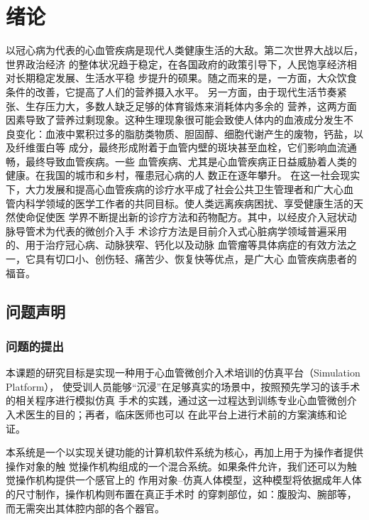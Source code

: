 \chapter{绪\;\;\;论}
\label{chap1}

以冠心病为代表的心血管疾病是现代人类健康生活的大敌。第二次世界大战以后，世界政治经济
的整体状况趋于稳定，在各国政府的政策引导下，人民饱享经济相对长期稳定发展、生活水平稳
步提升的硕果。随之而来的是，一方面，大众饮食条件的改善，它提高了人们的营养摄入水平。
另一方面，由于现代生活节奏紧张、生存压力大，多数人缺乏足够的体育锻炼来消耗体内多余的
营养，这两方面因素导致了营养过剩现象。这种生理现象很可能会致使人体内的血液成分发生不
良变化：血液中累积过多的脂肪类物质、胆固醇、细胞代谢产生的废物，钙盐，以及纤维蛋白等
成分，最终形成附着于血管内壁的斑块甚至血栓，它们影响血流通畅，最终导致血管疾病。一些
血管疾病、尤其是心血管疾病正日益威胁着人类的健康。在我国的城市和乡村，罹患冠心病的人
数正在逐年攀升\cite{moh2010annual}\cite{moh2008annual}\cite{moh2007annual}\cite{moh2005annual}\cite{moh2004annual}。
在这一社会现实下，大力发展和提高心血管疾病的诊疗水平成了社会公共卫生管理者和广大心血
管内科学领域的医学工作者的共同目标。使人类远离疾病困扰、享受健康生活的天然使命促使医
学界不断提出新的诊疗方法和药物配方。其中，以经皮介入冠状动脉导管术为代表的微创介入手
术诊疗方法是目前介入式心脏病学领域普遍采用的、用于治疗冠心病、动脉狭窄、钙化以及动脉
血管瘤等具体病症的有效方法之一，它具有切口小、创伤轻、痛苦少、恢复快等优点，是广大心
血管疾病患者的福音。

\section{问题声明}
\label{sec1-1}

\subsection{问题的提出}
\label{subsec1-1-1}

本课题的研究目标是实现一种用于心血管微创介入术培训的仿真平台（Simulation Platform），
使受训人员能够“沉浸”在足够真实的场景中，按照预先学习的该手术的相关程序进行模拟仿真
手术的实践，通过这一过程达到训练专业心血管微创介入术医生的目的；再者，临床医师也可以
在此平台上进行术前的方案演练和论证。

本系统是一个以实现关键功能的计算机软件系统为核心，再加上用于为操作者提供操作对象的触
觉操作机构组成的一个混合系统。如果条件允许，我们还可以为触觉操作机构提供一个感官上的
作用对象--仿真人体模型，这种模型将依据成年人体的尺寸制作，操作机构则布置在真正手术时
的穿刺部位，如：腹股沟、腕部等，而无需突出其体腔内部的各个器官。

